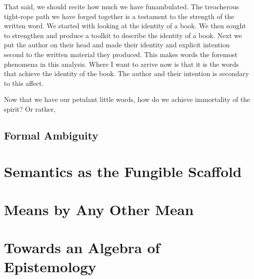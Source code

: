 \documentclass[12pt]{article}
\begin{document}
That said, we should recite how much we have funambulated. The treacherous
tight-rope path we have forged together is a testament to the strength of the
written word. We started with looking at the identity of a book. We then sought
to strengthen and produce a toolkit to describe the identity of a book. Next we
put the author on their head and made their identity and explicit intention
second to the written material they produced. This makes words the foremost
phenomena in this analysis. Where I want to arrive now is that it is the words
that achieve the identity of the book. The author and their intention is
secondary to this affect.

Now that we have our petulant little words, how do we achieve immortality of the
spirit? Or rather, 

\subsection{Formal Ambiguity}

\section{Semantics as the Fungible Scaffold}

\section{Means by Any Other Mean}

\section{Towards an Algebra of Epistemology}
\end{document}
